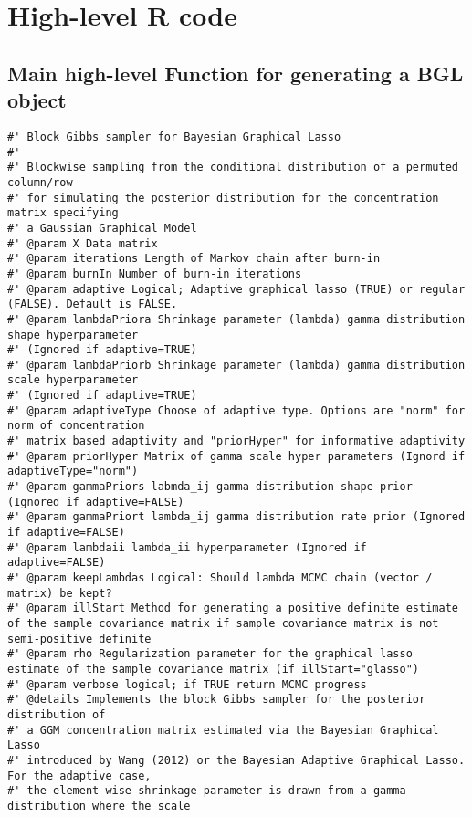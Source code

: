 \section{High-level R code}

\lstset{language=R, linewidth=6in, breaklines=true, 
	breakatwhitespace=true, breakindent=5pt, postbreak=\space}
\subsection{Main high-level Function for generating a BGL object}

\begin{lstlisting}
#' Block Gibbs sampler for Bayesian Graphical Lasso
#'
#' Blockwise sampling from the conditional distribution of a permuted column/row
#' for simulating the posterior distribution for the concentration matrix specifying
#' a Gaussian Graphical Model
#' @param X Data matrix
#' @param iterations Length of Markov chain after burn-in
#' @param burnIn Number of burn-in iterations
#' @param adaptive Logical; Adaptive graphical lasso (TRUE) or regular (FALSE). Default is FALSE.
#' @param lambdaPriora Shrinkage parameter (lambda) gamma distribution shape hyperparameter
#' (Ignored if adaptive=TRUE)
#' @param lambdaPriorb Shrinkage parameter (lambda) gamma distribution scale hyperparameter
#' (Ignored if adaptive=TRUE)
#' @param adaptiveType Choose of adaptive type. Options are "norm" for norm of concentration
#' matrix based adaptivity and "priorHyper" for informative adaptivity
#' @param priorHyper Matrix of gamma scale hyper parameters (Ignord if adaptiveType="norm")
#' @param gammaPriors labmda_ij gamma distribution shape prior (Ignored if adaptive=FALSE)
#' @param gammaPriort lambda_ij gamma distribution rate prior (Ignored if adaptive=FALSE)
#' @param lambdaii lambda_ii hyperparameter (Ignored if adaptive=FALSE)
#' @param keepLambdas Logical: Should lambda MCMC chain (vector / matrix) be kept?
#' @param illStart Method for generating a positive definite estimate of the sample covariance matrix if sample covariance matrix is not semi-positive definite
#' @param rho Regularization parameter for the graphical lasso estimate of the sample covariance matrix (if illStart="glasso")
#' @param verbose logical; if TRUE return MCMC progress
#' @details Implements the block Gibbs sampler for the posterior distribution of
#' a GGM concentration matrix estimated via the Bayesian Graphical Lasso
#' introduced by Wang (2012) or the Bayesian Adaptive Graphical Lasso. For the adaptive case,
#' the element-wise shrinkage parameter is drawn from a gamma distribution where the scale

\end{lstlisting}
